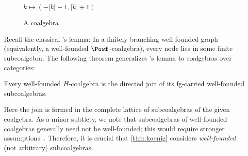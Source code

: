 \documentclass[a4paper,UKenglish, autoref, numberwithinsect, final]{lipics-v2021}
\numberwithin{equation}{section}
\newcommand{\injmono}{\ensuremath{\overset{\smash{\raisebox{-1pt}{\ensuremath{\scriptstyle+}}}}{\rightarrowtail}}}%
\newcommand{\hpresint}{\ensuremath{H\cap}\xspace}
\theoremstyle{plain}
\theoremstyle{definition}
\begin{document}
\begin{figure}%
  \begin{minipage}[b]{.40\textwidth}%
  \caption{Join of subcoalgebras.}
  \label{fig:joinSubcoalgebras}
  \end{minipage}%
  \begin{minipage}[b]{.30\textwidth}%
  \caption{Cartesianess.}
  \label{fig:joinCartesian}
  \end{minipage}%
  \begin{minipage}[b]{.30\textwidth}
    \centering
    \\[2mm]
    $k \mapsto (-|k|{-}1, |k|{+}1)$
  \caption{A coalgebra}
  \label{fig:coalgExample}
  \end{minipage}%
\end{figure}

Recall the classical \Konig's lemma: In a finitely branching well-founded graph (equivalently, a well-founded $\Powf$-coalgebra), every node lies in some finite subcoalgebra. The following theorem generalizes \Konig's lemma to coalgebras over \lfp categories:

\begin{theorem}[Coalgebraic \Konig's Lemma, \injmono, \hpresint]\label{thm:koenig}
Every well-founded $H$-coalgebra is the directed join of its fg-carried well-founded subcoalgebras.
\end{theorem}
Here the join is formed in the complete lattice of subcoalgebras of the given coalgebra. As a minor subtlety, we note that subcoalgebras of well-founded coalgebras generally need not be well-founded; this would require stronger assumptions~\cite[Prop.~8.4.7]{amm25}. Therefore, it is crucial that \autoref{thm:koenig} considers \emph{well-founded} (not arbitrary) subcoalgebras. 
\end{document}
